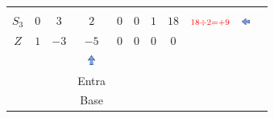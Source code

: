 \begin{frame}
{\begin{table}
\begin{tabular}{c c c c c c c c c c c}
				& \\
				\cline{1-8} 
				\cellcolor{blue!100} \color{red} $\scriptstyle S_3$
				& \cellcolor{yellow!50} $\scriptstyle 0$
				& \cellcolor{yellow!50} $\scriptstyle 3$
				& \cellcolor{gray!50} $\scriptstyle 2$
				& \cellcolor{yellow!50} $\scriptstyle 0$
				& \cellcolor{yellow!50} $\scriptstyle 0$
				& \cellcolor{yellow!50} $\scriptstyle 1$
				& \cellcolor{gray!50} $\scriptstyle 18$
				& $ \scriptstyle \color{red} 18 \div 2 = +9 $
				& \includegraphics[width=0.3cm,height=0.2cm]{setaesquerda.jpg}
				& \\
				\cline{1-8}
				\cellcolor{blue!100} \color{white} $\scriptstyle Z$
				& \cellcolor{yellow!50} $\scriptstyle 1$
				& \cellcolor{yellow!50} $\scriptstyle -3$
				& \cellcolor{gray!50} $\scriptstyle -5$
				& \cellcolor{yellow!50} $\scriptstyle 0$
				& \cellcolor{yellow!50} $\scriptstyle 0$
				& \cellcolor{yellow!50} $\scriptstyle 0$
				& \cellcolor{gray!50} $\scriptstyle 0$ 
				&
				&
				& \\
				\cline{1-8} 
				& 
				& 
				& \includegraphics[width=0.3cm,height=0.3cm]{setacima.jpg}
				& 
				& 
				& 
				&  
				&
				&
				& \\ 
				& 
				& 
				& \scriptsize \color{red} Entra 
				& 
				& 
				& 
				&  
				&
				&
				& \\
				& 
				& 
				& \scriptsize \color{red} Base 
				& 
				& 
				& 
				&  
				&
				&
				& \\


\end{tabular}
\end{table}}
\end{frame}
